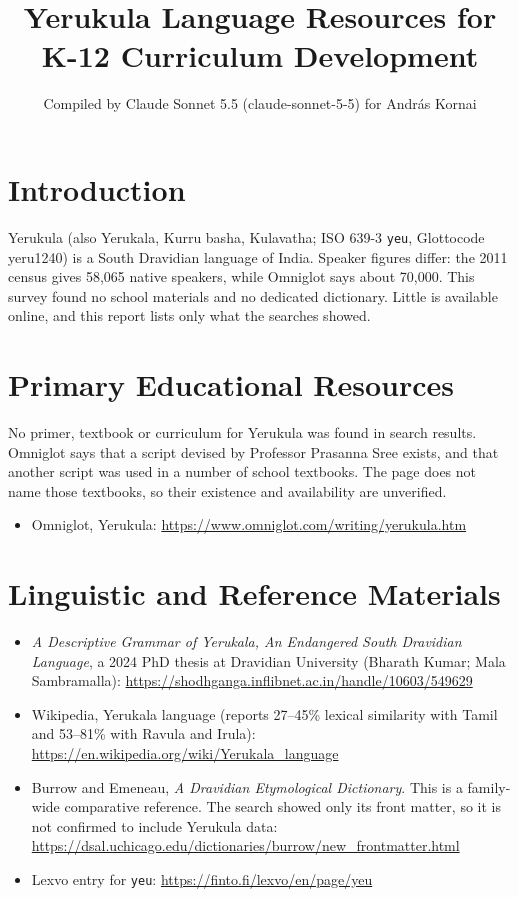 \documentclass[12pt]{article}
\title{Yerukula Language Resources for K-12 Curriculum Development}
\author{Compiled by Claude Sonnet 5.5 (claude-sonnet-5-5) for Andr\'as Kornai}
\date{}
\begin{document}
\maketitle

\section{Introduction}
Yerukula (also Yerukala, Kurru basha, Kulavatha; ISO 639-3 \texttt{yeu}, Glottocode yeru1240) is a South Dravidian language of India. Speaker figures differ: the 2011 census gives 58,065 native speakers, while Omniglot says about 70,000. This survey found no school materials and no dedicated dictionary. Little is available online, and this report lists only what the searches showed.

\section{Primary Educational Resources}
No primer, textbook or curriculum for Yerukula was found in search results. Omniglot says that a script devised by Professor Prasanna Sree exists, and that another script was used in a number of school textbooks. The page does not name those textbooks, so their existence and availability are unverified.
\begin{itemize}
\item Omniglot, Yerukula: \url{https://www.omniglot.com/writing/yerukula.htm}
\end{itemize}

\section{Linguistic and Reference Materials}
\begin{itemize}
\item \emph{A Descriptive Grammar of Yerukala, An Endangered South Dravidian Language}, a 2024 PhD thesis at Dravidian University (Bharath Kumar; Mala Sambramalla): \url{https://shodhganga.inflibnet.ac.in/handle/10603/549629}
\item Wikipedia, Yerukala language (reports 27--45\% lexical similarity with Tamil and 53--81\% with Ravula and Irula): \url{https://en.wikipedia.org/wiki/Yerukala_language}
\item Burrow and Emeneau, \emph{A Dravidian Etymological Dictionary}. This is a family-wide comparative reference. The search showed only its front matter, so it is not confirmed to include Yerukula data: \url{https://dsal.uchicago.edu/dictionaries/burrow/new_frontmatter.html}
\item Lexvo entry for \texttt{yeu}: \url{https://finto.fi/lexvo/en/page/yeu}
\end{itemize}
\end{document}

